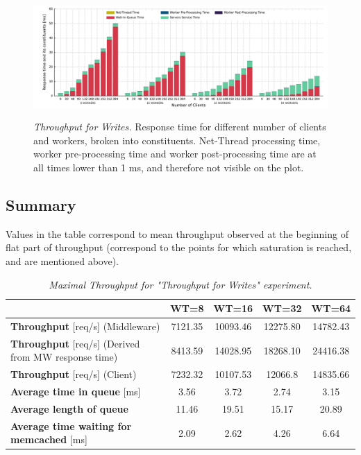 \documentclass[11pt,a4paper]{article}
\begin{document}
\begin{figure}[ht!]
	\centering	
	\includegraphics[width=1\linewidth]{../plots/experiment_write-only/timers/ALL_TIMES_TOGETHER_WRITE-ONLY.pdf}\\
	\caption{\textit{Throughput for Writes.} Response time for different number of clients and workers, broken into constituents. Net-Thread processing time, worker pre-processing time and worker post-processing time are at all times lower than 1 ms, and therefore not visible on the plot.}
	\label{Figure:experiment_write-only_all}	
\end{figure}

\subsection{Summary}

Values in the table correspond to mean throughput observed at the beginning of flat part of throughput (correspond to the points for which saturation is reached, and are mentioned above).
	
\begin{table}[!ht]
	\begin{adjustbox}{center}		
		\begin{tabulary}{\linewidth}{ | l | c | c | c | c |}
			\hline                                           			& 	\textbf{WT=8}	&	\textbf{WT=16}	&	\textbf{WT=32}		&	\textbf{WT=64} 		\\ 
			\hline \textbf{Throughput} [req/s] (Middleware)             			&	7121.35	&	10093.46	&	12275.80	&	14782.43	\\ 
			\hline \textbf{Throughput} [req/s] (Derived from MW response time)	&	8413.59	&	14028.95	&	18268.10	&	24416.38	\\ 
			\hline \textbf{Throughput} [req/s] (Client)                        	&	7232.32	&	10107.53	&	12066.8		&	14835.66	\\ 
			\hline \textbf{Average time in queue} [ms]							&	3.56	&	3.72		&	2.74		&	3.15		\\ 
			\hline \textbf{Average length of queue}                    			&	11.46	&	19.51		&	15.17		&	20.89       \\ 
			\hline \textbf{Average time waiting for memcached} [ms]				&	2.09	&	2.62		&	4.26		&	6.64       \\ 
			\hline 
		\end{tabulary}
	\end{adjustbox}
	\caption{\textit{Maximal Throughput for "Throughput for Writes" experiment.}}
	\label{table:writes:max_xput}
\end{table}
\end{document}
